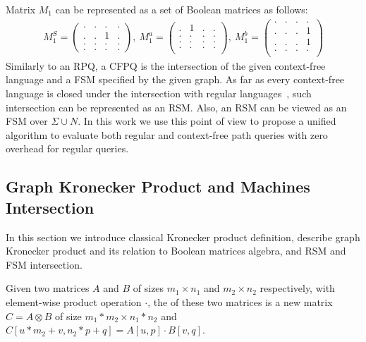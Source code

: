 Matrix $M_1$ can be represented as a set of Boolean matrices as follows:
{\small
\begin{align*}
M_1^S =
\begin{pmatrix}      
    . & . & . & .   \\
    . & . & 1 & .   \\
    . & . & . & .   \\
    . & . & . & .   
\end{pmatrix},~M_1^a =
\begin{pmatrix}       
   . & 1 & . & .   \\
   . & . & . & .   \\
   . & . & . & .   \\
   . & . & . & .   \\
\end{pmatrix},~M_1^b =
\begin{pmatrix}      
    . & . & . & .   \\
    . & . & . & 1   \\
    . & . & . & 1   \\
    . & . & . & .   \\
\end{pmatrix}
\end{align*}
}
Similarly to an RPQ, a CFPQ is the intersection of the given context-free language and a FSM specified by the given graph.
As far as every context-free language is closed under the intersection with regular languages~\citep{automata:theory:10.5555/1177300}, such intersection can be represented as an RSM.
Also, an RSM can be viewed as an FSM over $\Sigma \cup N$.
In this work we use this point of view to propose a unified algorithm to evaluate both regular and context-free path queries with zero overhead for regular queries.

\subsection{Graph Kronecker Product and Machines Intersection}

In this section we introduce classical Kronecker product definition,
describe graph Kronecker product and its relation to Boolean matrices algebra, 
and RSM and FSM intersection.

\begin{definition}
Given two matrices $A$ and $B$ of sizes $m_1 \times n_1$ and $m_2 \times n_2$ 
respectively, with element-wise product operation $\cdot$, the  of these two matrices is a new matrix $C = A \otimes B$ of size $m_1 * m_2 \times n_1 * n_2$ and $C[u * m_2 + v,n_2 * p + q] = A[u,p] \cdot B[v,q]$.
\end{definition}


